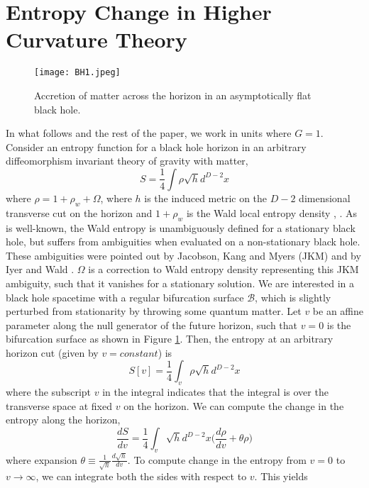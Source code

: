 \documentclass[12pt]{article}
\begin{document}
\section {Entropy Change in Higher Curvature Theory}
\begin{figure}[h]
  \centering
  \texttt{[image: BH1.jpeg]}
  \caption{Accretion of matter across the horizon in an asymptotically flat black hole.}
  \label{fig:BH1}
\end{figure}
\vspace{5mm}
In what follows and the rest of the paper, we work in units where $G=1$.
Consider an entropy function for a black hole horizon in an arbitrary diffeomorphism invariant theory of gravity with matter,
\begin{equation}\label{I1}
S= \frac{1}{4}\int \rho \sqrt{h} d^{D-2}x
\end{equation}
where  $\rho = 1 +\rho_w +\Omega$, where $h$ is the induced metric on the  $D-2$ dimensional transverse cut on the horizon and $1 + \rho_w$ is the Wald local entropy density \cite{Wald}, \cite{VR}. As is well-known, the Wald entropy is unambiguously defined for a stationary black hole, but suffers from ambiguities when evaluated on a non-stationary black hole. These ambiguities were pointed out by Jacobson, Kang and Myers (JKM) \cite{JKM} and by Iyer and Wald \cite{VR}. $\Omega$ is a correction to Wald entropy density representing this JKM ambiguity, such that it vanishes for a stationary solution. We are interested in a black hole spacetime with a regular bifurcation surface $\mathcal{B}$, which is slightly perturbed from stationarity by throwing some quantum matter. Let $v$ be an affine parameter along the null generator of the future horizon, such that $v=0$ is the bifurcation surface as shown in Figure \ref{fig:BH1}. Then, the entropy at an arbitrary horizon cut (given by $v= constant$) is
\begin{equation}\label{I2}
S[v]=\frac{1}{4}\int_v \rho \sqrt{h} d^{D-2}x
\end{equation}
where the subscript $v$ in the integral indicates that the integral is over the transverse space at fixed $v$ on the horizon.
We can compute the change in the entropy along the horizon,
\begin{equation}\label{I3}
\frac{dS}{dv}=\frac{1}{4}\int_v \sqrt{h} d^{D-2}x \Big(\frac{d\rho}{dv} +\theta \rho\Big)
\end{equation}
where expansion $\theta \equiv \frac{1}{\sqrt{h}}\frac{d\sqrt{h}}{dv}$. To compute change in the entropy from $v=0$ to $v \rightarrow \infty$, we can integrate both the sides with respect to $v$. This yields
\end{document}
